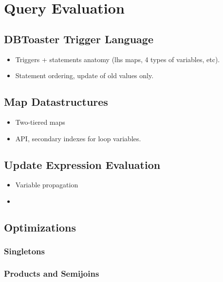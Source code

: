\section{Query Evaluation}

\subsection{DBToaster Trigger Language}

\begin{itemize}
  \item Triggers + statements anatomy (lhs maps, 4 types of variables, etc).
  \item Statement ordering, update of old values only.
\end{itemize}

\subsection{Map Datastructures}

\begin{itemize}
  \item Two-tiered maps
  \item API, secondary indexes for loop variables.
\end{itemize}

\subsection{Update Expression Evaluation}

\begin{itemize}
  \item Variable propagation
  \item 
\end{itemize}

\subsection{Optimizations}

\subsubsection{Singletons}

\subsubsection{Products and Semijoins}